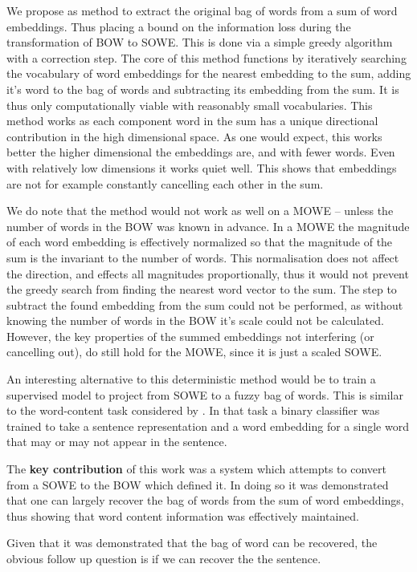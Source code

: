 \documentclass{book}
\begin{document}
We propose as method to extract the original bag of words from a sum of word embeddings.
Thus placing a bound on the information loss during the transformation of BOW to SOWE. This is done via a simple greedy algorithm with a correction step.
The core of this method functions by iteratively searching the vocabulary of word embeddings for the nearest embedding to the sum,
adding it's word to the bag of words and subtracting its embedding from the sum.
It is thus only computationally viable with reasonably small vocabularies.
This method works as each component word in the sum has a unique directional contribution in the high dimensional space.
As one would expect, this works better the higher dimensional the embeddings are, and with fewer words.
Even with relatively low dimensions it works quiet well.
This shows that embeddings are not for example constantly cancelling each other in the sum.

We do note that the method would not work as well on a MOWE -- unless the number of words in the BOW was known in advance.
In a MOWE the magnitude of each word embedding is effectively normalized so that the magnitude of the sum is the invariant to the number of words.
This normalisation does not affect the direction, and effects all magnitudes proportionally,
thus it would not prevent the greedy search from finding the nearest word vector to the sum.
The step to subtract the found embedding from the sum could not be performed,
as without knowing the number of words in the BOW it's scale could not be calculated.
However, the key properties of the summed embeddings not interfering (or cancelling out),
do still hold for the MOWE, since it is just a scaled SOWE.



An interesting alternative to this deterministic method would be to train a supervised model to project from SOWE to a fuzzy bag of words.
This is similar to the word-content task considered by
\citet{adi2017Probing}.
In that task a binary classifier was trained to take a sentence representation and a word embedding for a single word that may or may not appear in the sentence.


The \textbf{key contribution} of this work was a system which attempts to convert from a SOWE to the BOW which defined it.
In doing so it was demonstrated that one can largely recover the bag of words from the sum of word embeddings, thus showing that word content information was effectively maintained.


Given that it was demonstrated that the bag of word can be recovered,
the obvious follow up question is if we can recover the the sentence.
\end{document}
